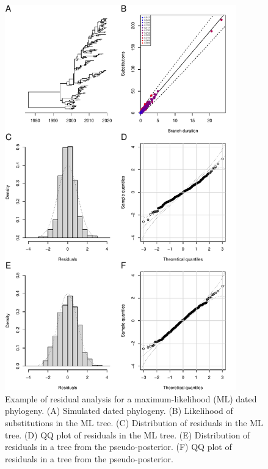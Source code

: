 \documentclass{article}
\begin{document}
\begin{figure}[p!]
\begin{center}
\includegraphics[width=10cm]{exampleML.pdf}
\end{center}
\caption{Example of residual analysis for a maximum-likelihood (ML) dated phylogeny.
(A) Simulated dated phylogeny. (B) Likelihood of substitutions in the ML tree.
(C) Distribution of residuals in the ML tree. 
(D) QQ plot of residuals in the ML tree.
(E) Distribution of residuals in a tree from the pseudo-posterior. 
(F) QQ plot of residuals in a tree from the pseudo-posterior.
\label{fig:exampleML}}
\end{figure}
\end{document}
